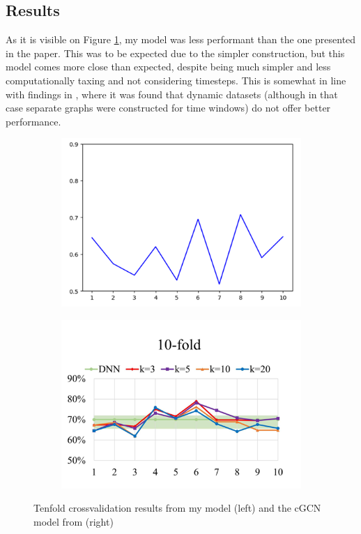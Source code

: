 	\subsection{Results}
	
	As it is visible on Figure \ref{fig:onlab_results}, my model was less performant than the one presented in the paper. This was to be expected due to the simpler construction, but this model comes more close than expected, despite being much simpler and less computationally taxing and not considering timesteps. This is somewhat in line with findings in \cite{said2023neurograph}, where it was found that dynamic datasets (although in that case separate graphs were constructed for time windows) do not offer better performance.
	
	\begin{figure}[!h]
		\centering
		\begin{subfigure}[b]{0.45\textwidth}
			\centering
			\includegraphics[width=\textwidth]{figures/onlab_results.png}
		\end{subfigure}
		\hfill
		\begin{subfigure}[b]{0.45\textwidth}
			\centering
			\includegraphics[width=\textwidth]{figures/paper_results.png}
		\end{subfigure}
		\caption{Tenfold crossvalidation results from my model (left) and the cGCN model from \cite{wang2021graph} (right)}
		\label{fig:onlab_results}
	\end{figure}

